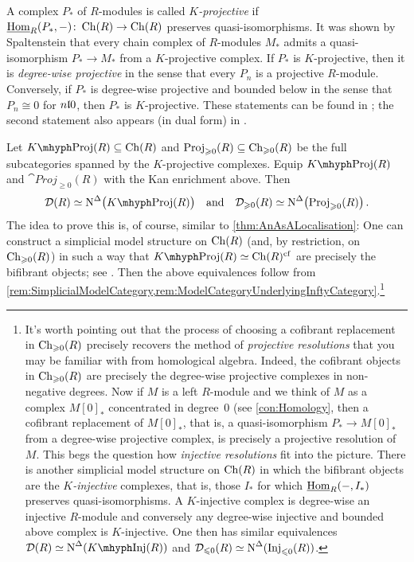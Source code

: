\begin{numpar}
	A complex $P_*$ of $R$-modules is called \emph{$K$-projective} if $\operatorname{\underline{Hom}}_R(P_*,-)\colon \operatorname{Ch}(R)\rightarrow \operatorname{Ch}(R)$ preserves quasi-isomorphisms. It was shown by Spaltenstein \cite{KProjective} that every chain complex of $R$-modules $M_*$ admits a quasi-isomorphism $P_*\rightarrow M_*$ from a $K$-projective complex. If $P_*$ is $K$-projective, then it is \emph{degree-wise projective} in the sense that every $P_n$ is a projective $R$-module. Conversely, if $P_*$ is degree-wise projective and bounded below in the sense that $P_n\cong0$ for $n\lle 0$, then $P_*$ is $K$-projective. These statements can be found in \cite[Lemma~\href{https://people.math.rochester.edu/faculty/doug/otherpapers/hovey-model-cats.pdf\#page=52}{2.3.6}]{HoveyModelCategories}; the second statement also appears (in dual form) in \cite[]{Stacks}.
	
	Let $K\mhyph\cat{Proj}(R)\subseteq\Ch(R)$ and $\mathrm{Proj}_{\geqslant 0}(R)\subseteq \operatorname{Ch}_{\geqslant 0}(R)$ be the full subcategories spanned by the $K$-projective complexes. Equip $K\mhyph\cat{Proj}(R)$ and $\cat{Proj}_{\geqslant 0}(R)$ with the Kan enrichment above. Then
	\begin{equation*}
		\Dd(R)\simeq \N^\Delta\bigl(K\mhyph\cat{Proj}(R)\bigr)\quad\text{and}\quad \Dd_{\geqslant 0}(R)\simeq \N^\Delta\bigl(\cat{Proj}_{\geqslant 0}(R)\bigr)\,.
	\end{equation*}
	The idea to prove this is, of course, similar to \cref{thm:AnAsALocalisation}: One can construct a simplicial model structure on $\operatorname{Ch}(R)$ (and, by restriction, on $\operatorname{Ch}_{\geqslant 0}(R)$) in such a way that $K\mhyph\cat{Proj}(R)\simeq \Ch(R)^\mathrm{cf}$ are precisely the bifibrant objects; see \cite[\S\href{https://people.math.rochester.edu/faculty/doug/otherpapers/hovey-model-cats.pdf\#page=50}{2.3}]{HoveyModelCategories}. Then the above equivalences follow from \cref{rem:SimplicialModelCategory,rem:ModelCategoryUnderlyingInftyCategory}.\footnote{It's worth pointing out that the process of choosing a cofibrant replacement in $\operatorname{Ch}_{\geqslant 0}(R)$ precisely recovers the method of \emph{projective resolutions} that you may be familiar with from homological algebra. Indeed, the cofibrant objects in $\operatorname{Ch}_{\geqslant 0}(R)$ are precisely the degree-wise projective complexes in non-negative degrees. Now if $M$ is a left $R$-module and we think of $M$ as a complex $M[0]_*$ concentrated in degree~$0$ (see \cref{con:Homology}, then a cofibrant replacement of $M[0]_*$, that is, a quasi-isomorphism $P_*\rightarrow M[0]_*$ from a degree-wise projective complex, is precisely a projective resolution of $M$. This begs the question how \emph{injective resolutions} fit into the picture. There is another simplicial model structure on $\operatorname{Ch}(R)$ in which the bifibrant objects are the \emph{$K$-injective} complexes, that is, those $I_*$ for which $\operatorname{\underline{Hom}}_R(-,I_*)$ preserves quasi-isomorphisms. A $K$-injective complex is degree-wise an injective $R$-module and conversely any degree-wise injective and bounded above complex is $K$-injective. One then has similar equivalences $\Dd(R)\simeq \N^\Delta(K\mhyph\cat{Inj}(R))$ and $\mathcal{D}_{\leqslant 0}(R)\simeq \operatorname{N}^\Delta(\mathrm{Inj}_{\leqslant 0}(R))$.}
	

\end{numpar}
